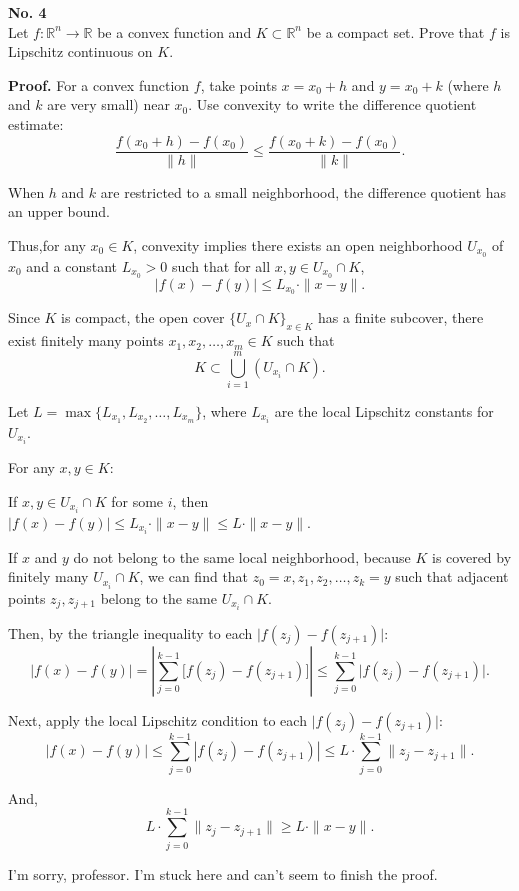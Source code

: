 \documentclass[a4paper, 11pt]{article}
\newenvironment{problem}[2][No.]
    { \begin{mdframed}[backgroundcolor=gray!5] \textbf{#1 #2} \\}
    {  \end{mdframed}}
\newenvironment{solution}
    {\textbf{Proof.}}
    {}
\begin{document}
\begin{problem}{4}
	Let \( f : \mathbb{R}^n \to \mathbb{R} \) be a convex function and \( K \subset \mathbb{R}^n \) be a compact set. Prove that \( f \) is Lipschitz continuous on \( K \).
\end{problem}

\begin{solution}
	For a convex function \( f \), take points \( x = x_0 + h \) and \( y = x_0 + k \) (where \( h \) and \( k \) are very small) near \( x_0 \). Use convexity to write the difference quotient estimate:
$$
	\frac{f(x_0 + h) - f(x_0)}{\|h\|} \leq \frac{f(x_0 + k) - f(x_0)}{\|k\|}.
$$

	When \( h \) and \( k \) are restricted to a small neighborhood, the difference quotient has an upper bound.
	
	Thus,for any \( x_0 \in K \), convexity implies there exists an open neighborhood \( U_{x_0} \) of \( x_0 \) and a constant \( L_{x_0} > 0 \) such that for all \( x, y \in U_{x_0} \cap K \), 
$$
	|f(x) - f(y)| \leq L_{x_0} \cdot \|x - y\|.
$$
	
	Since \( K \) is compact, the open cover \( \{ U_{x} \cap K \}_{x \in K} \) has a finite subcover, there exist finitely many points \( x_1, x_2, \dots, x_m \in K \) such that 
$$
	K \subset \bigcup_{i=1}^m (U_{x_i} \cap K).
$$
	
	Let \( L = \max\{ L_{x_1}, L_{x_2}, \dots, L_{x_m} \} \), where \( L_{x_i} \) are the local Lipschitz constants for \( U_{x_i} \). 
	
	For any \( x, y \in K \):
	
	If \( x, y \in U_{x_i} \cap K \) for some \( i \), then \( |f(x) - f(y)| \leq L_{x_i} \cdot \|x - y\| \leq L \cdot \|x - y\| \).  
	
	If \( x \) and \( y \) do not belong to the same local neighborhood, because \( K \) is covered by finitely many \( U_{x_i} \cap K \), we can find that \( z_0 = x, z_1, z_2, \dots, z_k = y \) such that adjacent points \( z_j, z_{j+1} \) belong to the same \( U_{x_i} \cap K \). 
	
	Then, by the triangle inequality to each \( \big| f(z_j) - f(z_{j+1}) \big| \): 
$$
	|f(x) - f(y)| = \left| \sum_{j=0}^{k-1} \big[ f(z_j) - f(z_{j+1}) \big] \right| \leq \sum_{j=0}^{k-1} \big| f(z_j) - f(z_{j+1}) \big|.
$$ 
	
     Next, apply the local Lipschitz condition to each \( \big| f(z_j) - f(z_{j+1}) \big| \): 
$$
	|f(x) - f(y)| \leq \sum_{j=0}^{k-1} |f(z_j) - f(z_{j+1})| \leq L \cdot \sum_{j=0}^{k-1} \|z_j - z_{j+1}\| .
$$

And,
$$
 L \cdot \sum_{j=0}^{k-1} \|z_j - z_{j+1}\| \geq L \cdot \|x - y\|.
$$

I'm sorry, professor. I'm stuck here and can't seem to finish the proof.
\end{solution}
\end{document}
